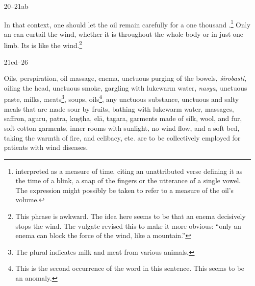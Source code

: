 \begin{translation}
    
    
     \item[20--21ab] 
     
     In that context, one should let the oil remain carefully for a
one thousand .\footnote{
    interpreted  as a measure of time, citing an
    unattributed verse defining it as the time of a blink, a snap of
    the fingers or the utterance of a single vowel. The expression
    might possibly be taken to refer to a measure of the oil's
    volume.} Only an  can curtail the wind,  whether
    it is throughout the whole body or in just one limb.  Its
     is like the wind.\footnote{This phrase is
        awkward. The idea here seems to be that an enema decisively stops
        the wind.  The vulgate revised this to make it more obvious:
        “only an enema can block the force of the wind, like a
        mountain.”}
    

    \item[21cd--26]
    
Oils, perspiration, oil massage, enema, unctuous purging of the
bowels, \textit{śirobasti}, oiling the head, unctuous smoke, gargling
with lukewarm water, \textit{nasya}, unctuous paste, milks, meats\footnote{The plural indicates milk
    and meat from various animals.}, soups, oils\footnote{This is the
        second occurrence of the word  in this sentence. This
        seems to be an anomaly.}, any unctuous substance, unctuous and salty
        meals that are made sour by fruits, bathing with lukewarm water,
        massages, saffron, \gls{aguru}, \gls{patra}, \gls{kuṣṭha}, \gls{elā},
        \gls{tagara}, garments made of silk, wool, and fur, soft cotton
        garments, inner rooms with sunlight, no wind flow, and a soft bed,
        taking the warmth of fire, and celibacy, etc. are to be collectively
        employed for patients with wind diseases.

    
  
        \bigskip       
    \begin{tt}


\end{tt}
\end{translation}
